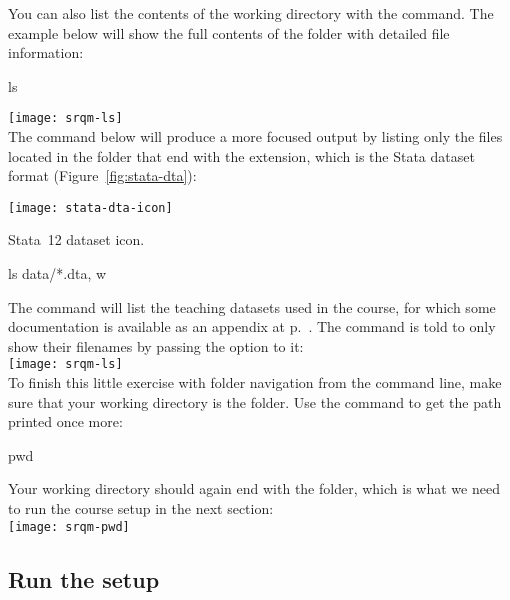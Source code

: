 	You can also list the contents of the working directory with the  command. The example below will show the full contents of the \SRQM folder with detailed file information:%
	
		\begin{docspec}
			ls
		\end{docspec}

		\texttt{[image: srqm-ls]}\\[1em]
			
	The  command below will produce a more focused output by listing only the files located in the \data folder that end with the  extension, which is the Stata dataset format (Figure~\ref{fig:stata-dta}):%

		\begin{marginfigure}
			\texttt{[image: stata-dta-icon]}
			\caption{Stata~12 dataset icon.}
			\label{fig:stata-dta}
		\end{marginfigure}

		\begin{docspec}
			ls data/*.dta, w
		\end{docspec}
			 
	The command will list the teaching datasets used in the course, for which some documentation is available as an appendix at p.~\pageref{ch:data-sources}. The  command is told to only show their filenames by passing the  option to it:\\[1em]%
 
		\texttt{[image: srqm-ls]}\\[1em]
	
	To finish this little exercise with folder navigation from the command line, make sure that your working directory is the \SRQM folder. Use the  command to get the path printed once more:%
	
		\begin{docspec}
			pwd
		\end{docspec}
	
	Your working directory should again end with the \SRQM folder, which is what we need to run the course setup in the next section:\\[1em]%
	
		\texttt{[image: srqm-pwd]}\\[1em]
  
  \subsection{Run the \SRQM setup}%
		\label{sec:setup}%

